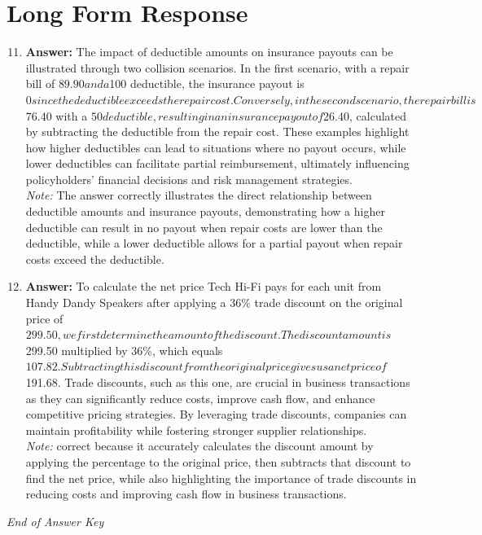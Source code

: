 \documentclass[12pt]{article}
\begin{document}
\section*{Long Form Response}
\begin{enumerate}[label=\arabic*.]
\setcounter{enumi}{10}
\item \textbf{Answer:} The impact of deductible amounts on insurance payouts can be illustrated through two collision scenarios. In the first scenario, with a repair bill of $89.90 and a $100 deductible, the insurance payout is $0 since the deductible exceeds the repair cost. Conversely, in the second scenario, the repair bill is $76.40 with a $50 deductible, resulting in an insurance payout of $26.40, calculated by subtracting the deductible from the repair cost. These examples highlight how higher deductibles can lead to situations where no payout occurs, while lower deductibles can facilitate partial reimbursement, ultimately influencing policyholders' financial decisions and risk management strategies.
\\ \textit{Note:} The answer correctly illustrates the direct relationship between deductible amounts and insurance payouts, demonstrating how a higher deductible can result in no payout when repair costs are lower than the deductible, while a lower deductible allows for a partial payout when repair costs exceed the deductible.
\item \textbf{Answer:} To calculate the net price Tech Hi-Fi pays for each unit from Handy Dandy Speakers after applying a 36\% trade discount on the original price of $299.50, we first determine the amount of the discount. The discount amount is $299.50 multiplied by 36\%, which equals $107.82. Subtracting this discount from the original price gives us a net price of $191.68. Trade discounts, such as this one, are crucial in business transactions as they can significantly reduce costs, improve cash flow, and enhance competitive pricing strategies. By leveraging trade discounts, companies can maintain profitability while fostering stronger supplier relationships.
\\ \textit{Note:} correct because it accurately calculates the discount amount by applying the percentage to the original price, then subtracts that discount to find the net price, while also highlighting the importance of trade discounts in reducing costs and improving cash flow in business transactions.
\end{enumerate}

\vfill
\noindent\textit{End of Answer Key}
\end{document}

